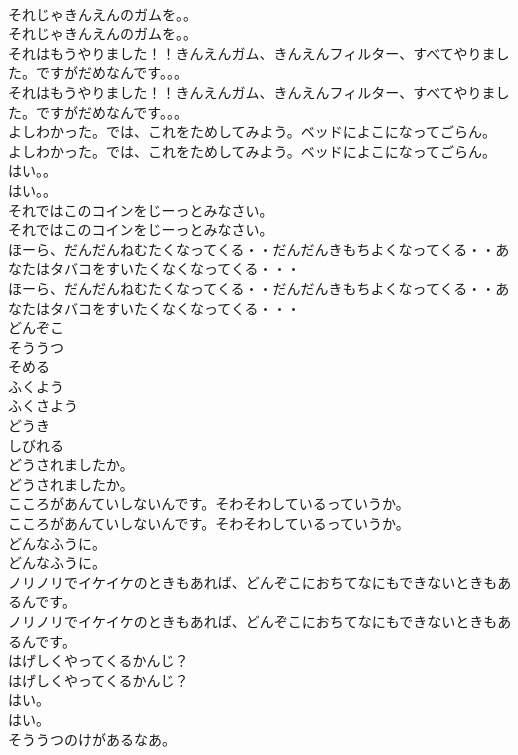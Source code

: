 \documentclass[8pt]{extreport}
\begin{document}
\begin{CJK}{UTF8}{min}
\\	それじゃきんえんのガムを。。
\\	それじゃきんえんのガムを。。
\\	それはもうやりました！！きんえんガム、きんえんフィルター、すべてやりました。ですがだめなんです。。。
\\	それはもうやりました！！きんえんガム、きんえんフィルター、すべてやりました。ですがだめなんです。。。
\\	よしわかった。では、これをためしてみよう。ベッドによこになってごらん。
\\	よしわかった。では、これをためしてみよう。ベッドによこになってごらん。
\\	はい。。
\\	はい。。
\\	それではこのコインをじーっとみなさい。
\\	それではこのコインをじーっとみなさい。
\\	ほーら、だんだんねむたくなってくる・・だんだんきもちよくなってくる・・あなたはタバコをすいたくなくなってくる・・・
\\	ほーら、だんだんねむたくなってくる・・だんだんきもちよくなってくる・・あなたはタバコをすいたくなくなってくる・・・
\\	どんぞこ
\\	そううつ
\\	そめる
\\	ふくよう
\\	ふくさよう
\\	どうき
\\	しびれる
\\	どうされましたか。
\\	どうされましたか。
\\	こころがあんていしないんです。そわそわしているっていうか。
\\	こころがあんていしないんです。そわそわしているっていうか。
\\	どんなふうに。
\\	どんなふうに。
\\	ノリノリでイケイケのときもあれば、どんぞこにおちてなにもできないときもあるんです。
\\	ノリノリでイケイケのときもあれば、どんぞこにおちてなにもできないときもあるんです。
\\	はげしくやってくるかんじ？
\\	はげしくやってくるかんじ？
\\	はい。
\\	はい。
\\	そううつのけがあるなあ。

\end{CJK}
\end{document}
